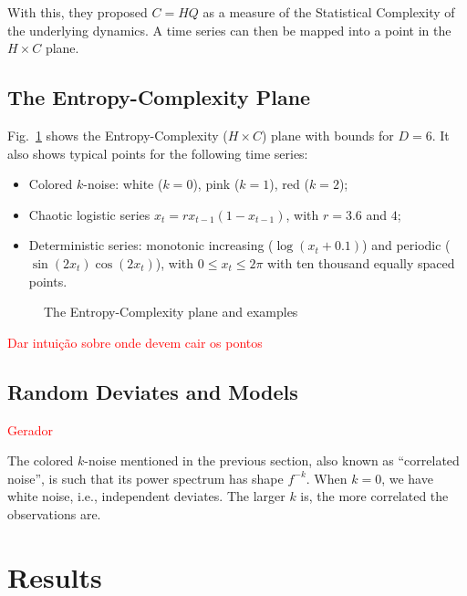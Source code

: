 \documentclass[sts]{imsart}
\begin{document}
With this, they proposed $C=HQ$ as a measure of the Statistical Complexity of the underlying dynamics.
A time series can then be mapped into a point in the $H\times C$ plane.


\subsection{The Entropy-Complexity Plane}

Fig.~\ref{fig:HCExamples} shows the Entropy-Complexity ($H\times C$) plane with bounds for $D=6$.
It also shows typical points for the following time series:
\begin{itemize}
\item Colored $k$-noise: white ($k=0$), pink ($k=1$), red ($k=2$);
\item Chaotic logistic series $x_t = r x_{t-1} (1 - x_{t-1})$, with $r=3.6$ and $4$;
\item Deterministic series: monotonic increasing ($\log(x_t+0.1)$) and periodic ($\sin(2x_t)\cos(2x_t)$), with $0\leq x_t\leq 2\pi$ with ten thousand equally spaced points.
\end{itemize}

\begin{figure}[hbt]
\caption{The Entropy-Complexity plane and examples}\label{fig:HCExamples}
\end{figure}

\textcolor{red}{Dar intui\c c\~ao sobre onde devem cair os pontos}

%


\subsection{Random Deviates and Models}

\textcolor{red}{Gerador}

The colored $k$-noise mentioned in the previous section, also known as ``correlated noise'', is such that its power spectrum has shape $f^{-k}$.
When $k=0$, we have white noise, i.e., independent deviates.
The larger $k$ is, the more correlated the observations are.


\section{Results}\label{Sec:Results}
\end{document}
